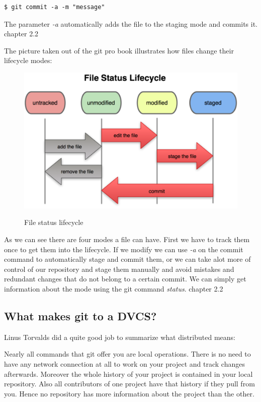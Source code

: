 \begin{lstlisting}
$ git commit -a -m "message"
\end{lstlisting}

The parameter \emph{-a} automatically adds the file to the staging mode and
commits it. \cite{gitpro2009} chapter 2.2

The picture taken out of the git pro book illustrates how files change their
lifecycle modes:

\begin{figure}[h]
  \includegraphics{img/file_status_lifecycle}
  \caption{File status lifecycle}
  \label{fig:File status lifecycle}
  \cite{piclifecycle}
\end{figure}

As we can see there are four modes a file can have. First we have to track them
once to get them into the lifecycle. If we modify we can use \emph{-a} on the
commit command to automatically stage and commit them, or we can take alot more
of control of our repository and stage them manually and avoid mistakes and
redundant changes that do not belong to a certain commit.
We can simply get information about the mode using the git command
\emph{status}. \cite{gitpro2009} chapter 2.2

\subsection {What makes git to a DVCS?}

Linus Torvalds did a quite good job to summarize what distributed means:

 \cite{linustorvaldsgoogletalk2007}

Nearly all commands that git offer you are local operations. There is no need to
have any network connection at all to work on your project and track changes
afterwards. Moreover the whole history of your project is contained in your
local repository. Also all contributors of one project have that history if
they pull from you. Hence no repository has more information about the project
than the other.

